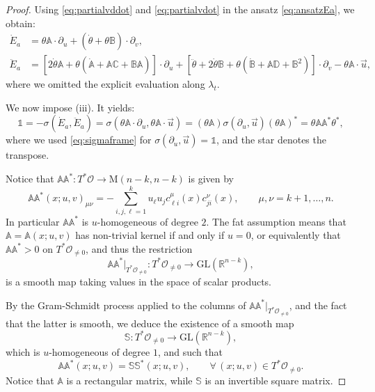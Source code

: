 \documentclass[11pt,a4paper]{article}
\theoremstyle{plain}
\theoremstyle{definition}
\theoremstyle{remark}
\numberwithin{equation}{section}
\newcommand{\R}{\mathbb{R}} %
\newcommand{\A}{\mathbb{A}}
\newcommand{\B}{\mathbb{B}}
\newcommand{\C}{\mathbb{C}}
\newcommand{\D}{\mathbb{D}}
\renewcommand{\S}{\mathbb{S}}
\begin{document}
\begin{proof}
Using \eqref{eq:partialvddot} and \eqref{eq:partialvdot} in the ansatz \eqref{eq:ansatzEa}, we obtain:
\begin{align}
\dot{E}_a & = \theta \A \cdot \partial_u + (\dot\theta +\theta \B) \cdot \partial_v, \label{eq:Eadot} \\
\ddot{E}_a & = [2\dot\theta \A+ \theta (\dot{\A} +\A\C + \B\A)] \cdot \partial_u + [\ddot{\theta} +2\dot\theta \B +\theta (\dot{\B} +\A\D + \B^2)] \cdot \partial_v - \theta \A \cdot \vec{u}, \label{eq:Eaddot} 
\end{align}
where we omitted the explicit evaluation along $\lambda_t$.

We now impose (iii). It yields:
\begin{equation} \label{eq:conditioniii}
\mathbb{1}  = -\sigma(\dot{E}_a,\ddot{E}_a)= \sigma(\theta \A \cdot \partial_u,\theta \A \cdot\vec{u}) =(\theta \A) \sigma(\partial_u,\vec{u})(\theta \A)^* = \theta \A\A^*\theta^*,
\end{equation}
where we used \eqref{eq:sigmaframe} for $\sigma(\partial_u,\vec{u}) = \mathbb{1}$, and the star denotes the transpose. 

Notice that $\A\A^* : T^*\mathcal{O} \to \mathrm{M}(n-k, n-k)$ is given by
\begin{equation}\label{eq:AAstar}
\A\A^*(x;u,v)_{\mu\nu}=-\sum_{i,j,\ell=1}^{k} u_\ell u_j c_{\ell i}^\mu(x) c_{j i}^\nu(x), \qquad \mu,\nu=k+1,\dots,n.
\end{equation}
In particular $\A\A^*$ is $u$-homogeneous of degree $2$. The fat assumption means that $\A=\A(x;u,v)$ has non-trivial kernel if and only if $u=0$, or equivalently that $\A\A^*>0$ on $T^*\mathcal{O}_{\neq 0}$, and thus the restriction
\begin{equation}
\A\A^*|_{T^*\mathcal{O}_{\neq 0}}: T^*\mathcal{O}_{\neq 0} \to \mathrm{GL}(\R^{n-k}),
\end{equation}
is a smooth map taking values in the space of scalar products.

By the Gram-Schmidt process applied to the columns of $\A\A^*|_{T^*\mathcal{O}_{\neq 0}}$, and the fact that the latter is smooth, we deduce the existence of a smooth map
\begin{equation}
\S:  T^*\mathcal{O}_{\neq 0} \to \mathrm{GL}(\R^{n-k}),
\end{equation}
which is $u$-homogeneous of degree $1$, and such that
\begin{equation}
\A\A^*(x;u,v) = \S\S^*(x;u,v), \qquad \forall\, (x;u,v)\in T^*\mathcal{O}_{\neq 0}.
\end{equation}
Notice that $\A$ is a rectangular matrix, while $\S$ is an invertible square matrix.


\end{proof}
\end{document}
